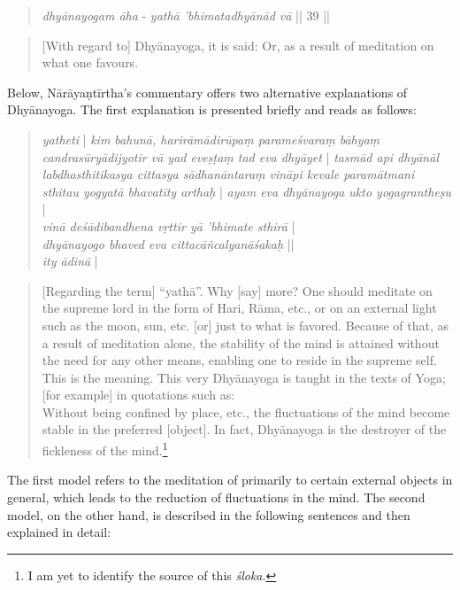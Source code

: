 \begin{quote}
\textit{dhyānayogam āha} - 
\textit{yathā 'bhimatadhyānād vā} || 39 ||
\end{quote}
\begin{quote}
[With regard to] Dhyānayoga, it is said: 
 Or, as a result of meditation on what one favours.
\end{quote}

Below, Nārāyaṇtīrtha's commentary offers two alternative explanations of Dhyānayoga. The first explanation is presented briefly and reads as follows: 

\begin{quote}
  \textit{yatheti} | \textit{kim bahunā, harirāmādirūpaṃ parameśvaraṃ bāhyaṃ candrasūryādijyotir vā yad eveṣṭaṃ tad eva dhyāyet} | \textit{tasmād api dhyānāl labdhasthitikasya cittasya sādhanāntaraṃ vināpi kevale paramātmani sthitau yogyatā bhavatīty arthaḥ} | \textit{ayam eva dhyānayoga ukto yogagrantheṣu} |\\
  
  \textit{vinā deśādibandhena vṛttir yā 'bhimate sthirā} |\\
  \textit{dhyānayogo bhaved eva cittacāñcalyanāśakaḥ} ||\\
    \textit{ity ādinā} | 
\end{quote}

\begin{quote}
  [Regarding the term] ``yathā''.  Why [say] more? One should meditate on the supreme lord in the form of Hari, Rāma, etc., or on an external light such as the moon, sun, etc. [or] just to what is favored. Because of that, as a result of meditation alone, the stability of the mind is attained without the need for any other means, enabling one to reside in the supreme self. This is the meaning. This very Dhyānayoga is taught in the texts of Yoga; [for example] in quotations such as: \\

  Without being confined by place, etc., the fluctuations of the mind become stable in the preferred [object]. In fact, Dhyānayoga is the destroyer of the fickleness of the mind.\footnote{I am yet to identify the source of this \textit{śloka}.}\\
  
\end{quote}

The first model refers to the meditation of primarily to certain external objects in general, which leads to the reduction of fluctuations in the mind. 
The second model, on the other hand, is described in the following sentences and then explained in detail:

